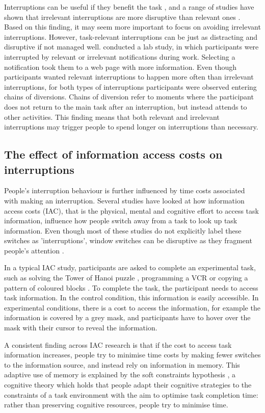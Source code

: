 Interruptions can be useful if they benefit the task \citep{Jin2009}, and a range of studies have shown that irrelevant interruptions are more disruptive than relevant ones \citep[e.g.][]{Adamczyk2004, Gould2013a}. Based on this finding, it may seem more important to focus on avoiding irrelevant interruptions. However, task-relevant interruptions can be just as distracting and disruptive if not managed well. \citet{Iqbal2008} conducted a lab study, in which participants were interrupted by relevant or irrelevant notifications during work. Selecting a notification took them to a web page with more information. Even though participants wanted relevant interruptions to happen more often than irrelevant interruptions, for both types of interruptions participants were observed entering chains of diversions. Chains of diversion refer to moments where the participant does not return to the main task after an interruption, but instead attends to other activities. This finding means that both relevant and irrelevant interruptions may trigger people to spend longer on interruptions than necessary.

\subsection{The effect of information access costs on interruptions}
People’s interruption behaviour is further influenced by time costs associated with making an interruption. Several studies have looked at how information access costs (IAC), that is the physical, mental and cognitive effort to access task information, influence how people switch away from a task to look up task information. Even though most of these studies do not explicitly label these switches as 'interruptions', window switches can be  disruptive as they fragment people's attention \citep{Rule2015}. 

In a typical IAC study, participants are asked to complete an experimental task, such as solving the Tower of Hanoi puzzle \citep{Waldron2007}, programming a VCR \citep{Gray2004} or copying a pattern of coloured blocks \citep{Gray2006}. To complete the task, the participant needs to access task information. In the control condition, this information is easily accessible. In experimental conditions, there is a cost to access the information, for example the information is covered by a grey mask, and participants have to hover over the mask with their cursor to reveal the information. 

A consistent finding across IAC research is that if the cost to access task information increases, people try to minimise time costs by making fewer switches to the information source, and instead rely on information in memory. This adaptive use of memory is explained by the soft constraints hypothesis \citep{Gray2006}, a cognitive theory which holds that people adapt their cognitive strategies to the constraints of a task environment with the aim to optimise task completion time: rather than preserving cognitive resources, people try to minimise time.


